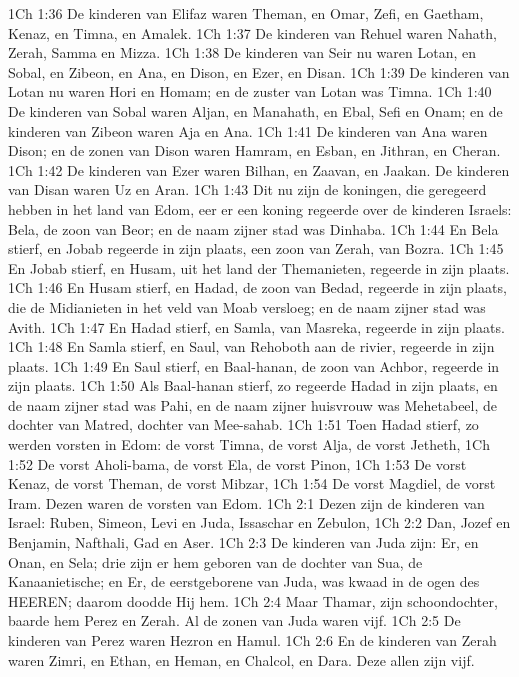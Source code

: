 1Ch 1:36  De kinderen van Elifaz waren Theman, en Omar, Zefi, en Gaetham, Kenaz, en Timna, en Amalek.
1Ch 1:37  De kinderen van Rehuel waren Nahath, Zerah, Samma en Mizza.
1Ch 1:38  De kinderen van Seir nu waren Lotan, en Sobal, en Zibeon, en Ana, en Dison, en Ezer, en Disan.
1Ch 1:39  De kinderen van Lotan nu waren Hori en Homam; en de zuster van Lotan was Timna.
1Ch 1:40  De kinderen van Sobal waren Aljan, en Manahath, en Ebal, Sefi en Onam; en de kinderen van Zibeon waren Aja en Ana.
1Ch 1:41  De kinderen van Ana waren Dison; en de zonen van Dison waren Hamram, en Esban, en Jithran, en Cheran.
1Ch 1:42  De kinderen van Ezer waren Bilhan, en Zaavan, en Jaakan. De kinderen van Disan waren Uz en Aran.
1Ch 1:43  Dit nu zijn de koningen, die geregeerd hebben in het land van Edom, eer er een koning regeerde over de kinderen Israels: Bela, de zoon van Beor; en de naam zijner stad was Dinhaba.
1Ch 1:44  En Bela stierf, en Jobab regeerde in zijn plaats, een zoon van Zerah, van Bozra.
1Ch 1:45  En Jobab stierf, en Husam, uit het land der Themanieten, regeerde in zijn plaats.
1Ch 1:46  En Husam stierf, en Hadad, de zoon van Bedad, regeerde in zijn plaats, die de Midianieten in het veld van Moab versloeg; en de naam zijner stad was Avith.
1Ch 1:47  En Hadad stierf, en Samla, van Masreka, regeerde in zijn plaats.
1Ch 1:48  En Samla stierf, en Saul, van Rehoboth aan de rivier, regeerde in zijn plaats.
1Ch 1:49  En Saul stierf, en Baal-hanan, de zoon van Achbor, regeerde in zijn plaats.
1Ch 1:50  Als Baal-hanan stierf, zo regeerde Hadad in zijn plaats, en de naam zijner stad was Pahi, en de naam zijner huisvrouw was Mehetabeel, de dochter van Matred, dochter van Mee-sahab.
1Ch 1:51  Toen Hadad stierf, zo werden vorsten in Edom: de vorst Timna, de vorst Alja, de vorst Jetheth,
1Ch 1:52  De vorst Aholi-bama, de vorst Ela, de vorst Pinon,
1Ch 1:53  De vorst Kenaz, de vorst Theman, de vorst Mibzar,
1Ch 1:54  De vorst Magdiel, de vorst Iram. Dezen waren de vorsten van Edom.
1Ch 2:1  Dezen zijn de kinderen van Israel: Ruben, Simeon, Levi en Juda, Issaschar en Zebulon,
1Ch 2:2  Dan, Jozef en Benjamin, Nafthali, Gad en Aser.
1Ch 2:3  De kinderen van Juda zijn: Er, en Onan, en Sela; drie zijn er hem geboren van de dochter van Sua, de Kanaanietische; en Er, de eerstgeborene van Juda, was kwaad in de ogen des HEEREN; daarom doodde Hij hem.
1Ch 2:4  Maar Thamar, zijn schoondochter, baarde hem Perez en Zerah. Al de zonen van Juda waren vijf.
1Ch 2:5  De kinderen van Perez waren Hezron en Hamul.
1Ch 2:6  En de kinderen van Zerah waren Zimri, en Ethan, en Heman, en Chalcol, en Dara. Deze allen zijn vijf.

